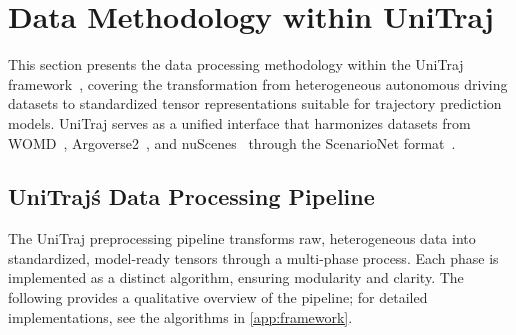 \section{Data Methodology within UniTraj}
\label{sec:data_methodology}

This section presents the data processing methodology within the UniTraj framework~\cite{unitrajFeng2024}, covering the transformation from heterogeneous autonomous driving datasets to standardized tensor representations suitable for trajectory prediction models. UniTraj serves as a unified interface that harmonizes datasets from WOMD~\cite{WOMD2021}, Argoverse2~\cite{av2Wilson2023}, and nuScenes~\cite{caesar2020nuscenes} through the ScenarioNet format~\cite{scenarionetLi2023}.

\subsection{UniTraj\'s Data Processing Pipeline}
\label{ssec:data_pipeline}

The UniTraj preprocessing pipeline transforms raw, heterogeneous data into standardized, model-ready tensors through a multi-phase process. Each phase is implemented as a distinct algorithm, ensuring modularity and clarity. The following provides a qualitative overview of the pipeline; for detailed implementations, see the algorithms in \autoref{app:framework}.

